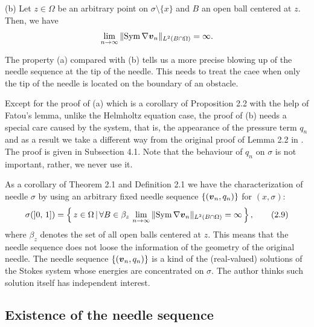 \noindent
(b)  Let $z\in\Omega$ be an arbitrary point on $\sigma\setminus\{x\}$ and $B$ an open ball centered at $z$.
Then, we have
$$\displaystyle
\lim_{n\rightarrow\infty}\Vert \text{Sym}\,\nabla\mbox{\boldmath $v$}_n\Vert_{L^2(B\cap\Omega)}=\infty.
$$




\endproclaim

The property (a) compared with (b) tells us a more precise blowing up of the needle sequence at the tip of the needle.
This needs to treat the caee when only the tip of the needle is located on the boundary of an obstacle.

Except for the proof of  (a) which is a corollary of Proposition 2.2 with the help of Fatou's lemma,
unlike the Helmholtz equation case,  the proof of (b) needs a special care 
caused by the system, that is, the appearance of the pressure term $q_n$ and as a result we take a different way from the original proof of Lemma 2.2 in \cite{INew}.
The proof is given in Subsection 4.1.
Note that the behaviour of $q_n$ on $\sigma$ is not important, rather, we never use it.


As a corollary of Theorem 2.1 and Definition 2.1 
we have the characterization of  needle $\sigma$ by using an
arbitrary fixed needle sequence $\{(\mbox{\boldmath $v$}_n,q_n)\}$ for $(x,\sigma)$:
$$\displaystyle
\sigma(]0,\,1])=
\left\{\,z\in\Omega\,\vert\,\forall B\in\beta_z
\,
\lim_{n\rightarrow\infty}\Vert \text{Sym}\,\nabla\mbox{\boldmath $v$}_n\Vert_{L^2(B\cap\Omega)}=\infty\,
\right\},
\tag {2.9}
$$
where $\beta_z$ denotes the set of all open balls centered at $z$.
This means that the needle sequence does not loose the information of the geometry of the original needle.
The needle sequence $\{(\mbox{\boldmath $v$}_n,q_n)\}$ is a kind of the (real-valued)
solutions of the Stokes system 
whose energies are concentrated on $\sigma$.  The author thinks such solution itself  has independent interest.



























\subsection{Existence of the needle sequence}









